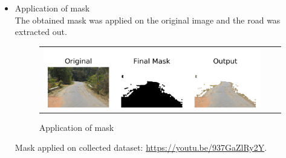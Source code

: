 \documentclass[12pt,a4paper]{article}
\begin{document}
\begin{itemize}
\begin{figure}[!ht]
\begin{center}
\end{center}
\end{figure} 


\item Application of mask \\
    The obtained mask was applied on the original image and the road was extracted out. 

\begin{figure}[!ht]
\begin{center}

\begin{tabular}{ccc}
\centering
\includegraphics[width = 5in]{images/output.png}
\end{tabular}
\caption{Application of mask}

\end{center}
\end{figure} 

    Mask applied on collected dataset: \url{https://youtu.be/937GaZlRy2Y}.

    
% 
 
\newpage     
 

\end{itemize}
\end{document}
